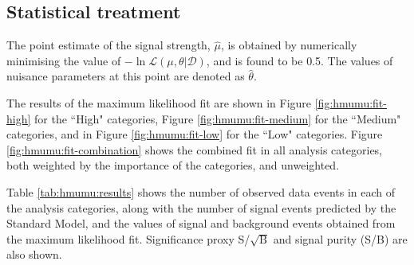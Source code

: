 \subsection{Statistical treatment}

The point estimate of the signal strength, $\hat\mu$, is obtained
by numerically minimising the value of $-\ln{\mathcal{L}}(\mu, \theta | \mathcal{D})$,
and is found to be 0.5. The values of nuisance parameters at this
point are denoted as $\hat\theta$.

The results of the maximum likelihood fit are shown in Figure
\ref{fig:hmumu:fit-high} for the ``High" categories, Figure
\ref{fig:hmumu:fit-medium} for the ``Medium" categories,
and in Figure \ref{fig:hmumu:fit-low} for the ``Low" categories.
Figure \ref{fig:hmumu:fit-combination} shows the combined fit in
all analysis categories, both weighted by the importance of the
categories, and unweighted.

Table \ref{tab:hmumu:results} shows the number of observed data events
in each of the analysis categories, along with the number of signal events
predicted by the Standard Model, and the values of signal and background
events obtained from the maximum likelihood fit. Significance proxy
S/$\sqrt{\text{B}}$ and signal purity (S/B) are also shown.

